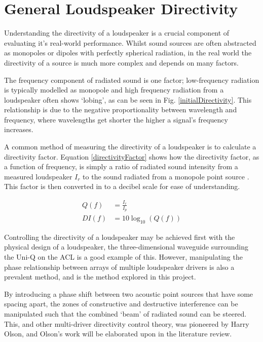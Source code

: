 \documentclass{report}
\begin{document}
    \section{General Loudspeaker Directivity}
        Understanding the directivity of a loudspeaker is a crucial component of evaluating it's real-world performance.
        Whilst sound sources are often abstracted as monopoles or dipoles with perfectly spherical radiation, in the real world the directivity of a source is much more complex and depends on many factors.
        
        The frequency component of radiated sound is one factor; low-frequency radiation is typically modelled as monopole and high frequency radiation from a loudspeaker often shows `lobing', as can be seen in Fig. \ref{initialDirectivity}.
        This relationship is due to the negative proportionality between wavelength and frequency, where wavelengths get shorter the higher a signal's frequency increases. 

        A common method of measuring the directivity of a loudspeaker is to calculate a directivity factor.
        Equation \ref{directivityFactor} shows how the directivity factor, as a function of frequency, is simply a ratio of radiated sound intensity from a measured loudspeaker $I_r$ to the sound radiated from a monopole point source \cite{meggitt2020loudspeakers}.
        This factor is then converted in to a decibel scale for ease of understanding.

        \begin{equation}
            \begin{split}
                Q(f) &= \frac{I_r}{I_p} \\
                DI(f) &= 10\log_{10}(Q(f))
                \label{directivityFactor}
            \end{split}
        \end{equation}
        
        Controlling the directivity of a loudspeaker may be achieved first with the physical design of a loudspeaker, the three-dimensional waveguide surrounding the Uni-Q on the ACL is a good example of this.
        However, manipulating the phase relationship between arrays of multiple loudspeaker drivers is also a prevalent method, and is the method explored in this project.

        By introducing a phase shift between two acoustic point sources that have some spacing apart, the zones of constructive and destructive interference can be manipulated such that the combined `beam' of radiated sound can be steered.
        This, and other multi-driver directivity control theory, was pioneered by Harry Olson, and Olson's work will be elaborated upon in the literature review.
        
\end{document}

